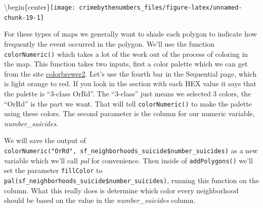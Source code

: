 \documentclass[
  12pt,
]{book}
\newenvironment{Shaded}{\begin{snugshade}}{\end{snugshade}}
\newcommand{\AttributeTok}[1]{\textcolor[rgb]{0.61,0.61,0.61}{#1}}
\newcommand{\DecValTok}[1]{\textcolor[rgb]{0.06,0.06,0.06}{#1}}
\newcommand{\FunctionTok}[1]{\textcolor[rgb]{0,0,0}{#1}}
\newcommand{\NormalTok}[1]{#1}
\newcommand{\OtherTok}[1]{\textcolor[rgb]{0.37,0.37,0.37}{#1}}
\newcommand{\SpecialCharTok}[1]{\textcolor[rgb]{0,0,0}{#1}}
\newcommand{\StringTok}[1]{\textcolor[rgb]{0.5,0.5,0.5}{#1}}
\begin{document}
\textbackslash begin\{center\}\texttt{[image: crimebythenumbers\_files/figure-latex/unnamed-chunk-19-1]}

For these types of maps we generally want to shade each polygon to indicate how frequently the event occurred in the polygon. We'll use the function \texttt{colorNumeric()} which takes a lot of the work out of the process of coloring in the map. This function takes two inputs, first a color palette which we can get from the site \href{http://colorbrewer2.org/\#type=sequential\&scheme=OrRd\&n=3}{colorbrewer2}. Let's use the fourth bar in the Sequential page, which is light orange to red. If you look in the section with each HEX value it says that the palette is ``3-class OrRd''. The ``3-class'' just means we selected 3 colors, the ``OrRd'' is the part we want. That will tell \texttt{colorNumeric()} to make the palette using these colors. The second parameter is the column for our numeric variable, \emph{number\_suicides}.

We will save the output of \texttt{colorNumeric("OrRd",\ sf\_neighborhoods\_suicide\$number\_suicides)} as a new variable which we'll call \emph{pal} for convenience. Then inside of \texttt{addPolygons()} we'll set the parameter \texttt{fillColor} to \texttt{pal(sf\_neighborhoods\_suicide\$number\_suicides)}, running this function on the column. What this really does is determine which color every neighborhood should be based on the value in the \emph{number\_suicides} column.

\begin{Shaded}
\end{Shaded}
\end{document}
